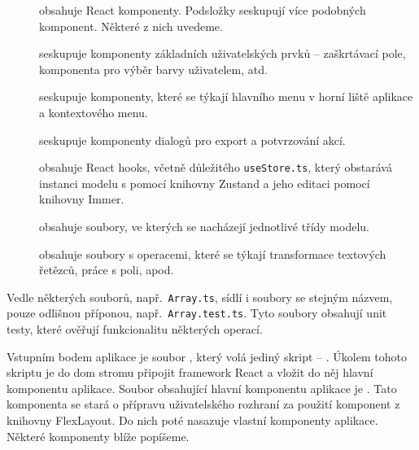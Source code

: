 \begin{description}
  \item[] obsahuje React komponenty.
    Podsložky seskupují více podobných komponent.
    Některé z nich uvedeme.
  \item[] seskupuje komponenty základních uživatelských prvků -- zaškrtávací pole, komponenta pro výběr barvy uživatelem, atd.
  \item[] seskupuje komponenty, které se týkají hlavního menu v horní liště aplikace a kontextového menu.
  \item[] seskupuje komponenty dialogů pro export a potvrzování akcí.
  \item[] obsahuje React hooks, včetně důležitého \texttt{useStore.ts}, který obstarává instanci modelu s pomocí knihovny Zustand a jeho editaci pomocí knihovny Immer.
  \item[] obsahuje soubory, ve kterých se nacházejí jednotlivé třídy modelu.
  \item[] obsahuje soubory s operacemi, které se týkají transformace textových řetězců, práce s poli, apod.
\end{description}

Vedle některých souborů, např.~\texttt{Array.ts}, sídlí i soubory se stejným názvem, pouze odlišnou příponou, např.~\texttt{Array.test.ts}.
Tyto soubory obsahují unit testy, které ověřují funkcionalitu některých operací.

Vstupním bodem aplikace je soubor , který volá jediný skript -- .
Úkolem tohoto skriptu je do \acrshort{dom} stromu připojit framework React a vložit do něj hlavní komponentu aplikace.
Soubor obsahující hlavní komponentu aplikace je .
Tato komponenta se stará o přípravu uživatelského rozhraní za použití komponent z knihovny FlexLayout.
Do nich poté nasazuje vlastní komponenty aplikace.
Některé komponenty blíže popíšeme.


